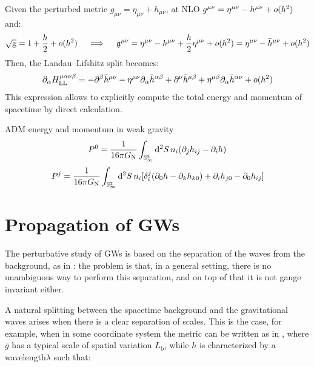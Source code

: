 Given the perturbed metric $ g_{\mu \nu} = \eta_{\mu \nu} + h_{\mu \nu} $, at NLO $ g^{\mu \nu} = \eta^{\mu \nu} - h^{\mu \nu} + o(h^2) $ and:
\begin{equation*}
  \sqrt{\mathrm{g}} = 1 + \frac{h}{2} + o(h^2)
  \quad \implies \quad
  \mathfrak{g}^{\mu \nu} = \eta^{\mu \nu} - h^{\mu \nu} + \frac{h}{2} \eta^{\mu \nu} + o(h^2) = \eta^{\mu \nu} - \bar{h}^{\mu \nu} + o(h^2)
\end{equation*}
Then, the Landau--Lifshitz split  becomes:
\begin{equation*}
  \partial_\alpha H^{\mu \alpha \nu \beta}_\text{LL} = - \partial^\beta \bar{h}^{\mu \nu} - \eta^{\mu \nu} \partial_\alpha \bar{h}^{\alpha \beta} + \partial^\nu \bar{h}^{\mu \beta} + \eta^{\mu \beta} \partial_\alpha \bar{h}^{\alpha \nu} + o(h^2)
\end{equation*}
This expression allows to explicitly compute the total energy and momentum of spacetime by direct calculation.

\begin{lemma}[before upper = {\tcbtitle}]{ADM energy and momentum in weak gravity}{}
  \begin{equation}
    P^0 = \frac{1}{16\pi G_\text{N}} \int_{\mathbb{S}^{2}_\infty} \mathrm{d}^2S \, n_i (\partial_j h_{ij} - \partial_i h)
  \end{equation}
  \begin{equation}
    P^j = \frac{1}{16\pi G_\text{N}} \int_{\mathbb{S}^{2}_\infty} \mathrm{d}^2S \, n_i [\delta_i^j (\partial_0 h - \partial_k h_{k0}) + \partial_i h_{j0} - \partial_0 h_{ij}]
  \end{equation}
\end{lemma}

\section{Propagation of GWs}

The perturbative study of GWs is based on the separation of the waves from the background, as in : the problem is that, in a general setting, there is no unambiguous way to perform this separation, and on top of that it is not gauge invariant either.

A natural splitting between the spacetime background and the gravitational waves arises when there is a clear separation of scales. This is the case, for example, when in some coordinate system the metric can be written as in , where $ \bar{g} $ has a typical scale of spatial variation $ L_\text{b} $, while $ h $ is characterized by a wavelength\footnotemark $ \lambda $ such that:

